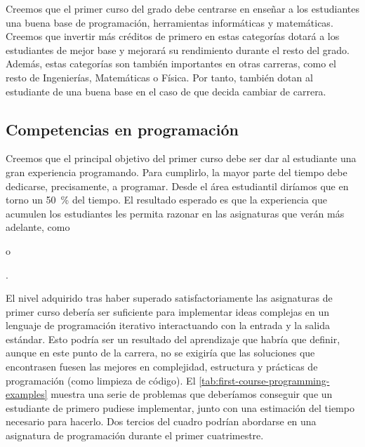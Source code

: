 Creemos que el primer curso del grado debe centrarse en
enseñar a los estudiantes una buena base de
programación,
herramientas informáticas y
matemáticas.
Creemos que invertir más créditos de primero en estas categorías
dotará a los estudiantes de mejor base y
mejorará su rendimiento durante el resto del grado. 
Además, estas categorías son también importantes en otras carreras,
como el resto de Ingenierías, Matemáticas o Física.
Por tanto, también dotan al estudiante de una buena base
en el caso de que decida cambiar de carrera.

\subsection{Competencias en programación}

Creemos que el principal objetivo del primer curso debe ser
dar al estudiante una gran experiencia programando.
Para cumplirlo, la mayor parte del tiempo debe dedicarse,
precisamente, a programar.
Desde el área estudiantil diríamos que
en torno un \SI{50}{\percent} del tiempo.
El resultado esperado es que la experiencia que acumulen los estudiantes
les permita razonar en las asignaturas que verán más adelante,
como \subject{Programación Orientada a Objetos} o
\subject{Algoritmos y Estructuras de Datos}\footnotemark.


El nivel adquirido tras
haber superado satisfactoriamente las asignaturas de primer curso
debería ser suficiente para implementar ideas complejas en
un lenguaje de programación iterativo
interactuando con la entrada y la salida estándar.
Esto podría ser un resultado del aprendizaje que habría que definir,
aunque en este punto de la carrera,
no se exigiría que las soluciones que encontrasen fuesen las mejores en
complejidad, estructura y prácticas de programación
(como limpieza de código).
El \cref{tab:first-course-programming-examples}
muestra una serie de problemas que deberíamos conseguir que
un estudiante de primero pudiese implementar,
junto con una estimación del tiempo necesario para hacerlo.
Dos tercios del cuadro podrían abordarse en
una asignatura de programación durante el primer cuatrimestre.


